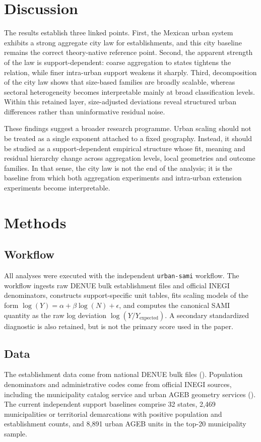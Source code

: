\documentclass[11pt]{article}
\begin{document}
\section*{Discussion}
The results establish three linked points. First, the Mexican urban system exhibits a strong aggregate city law for establishments, and this city baseline remains the correct theory-native reference point. Second, the apparent strength of the law is support-dependent: coarse aggregation to states tightens the relation, while finer intra-urban support weakens it sharply. Third, decomposition of the city law shows that size-based families are broadly scalable, whereas sectoral heterogeneity becomes interpretable mainly at broad classification levels. Within this retained layer, size-adjusted deviations reveal structured urban differences rather than uninformative residual noise.

These findings suggest a broader research programme. Urban scaling should not be treated as a single exponent attached to a fixed geography. Instead, it should be studied as a support-dependent empirical structure whose fit, meaning and residual hierarchy change across aggregation levels, local geometries and outcome families. In that sense, the city law is not the end of the analysis; it is the baseline from which both aggregation experiments and intra-urban extension experiments become interpretable.

\section*{Methods}
\subsection*{Workflow}
All analyses were executed with the independent \texttt{urban-sami} workflow. The workflow ingests raw DENUE bulk establishment files and official INEGI denominators, constructs support-specific unit tables, fits scaling models of the form $\log(Y) = \alpha + \beta \log(N) + \epsilon$, and computes the canonical SAMI quantity as the raw log deviation $\log(Y/Y_{\mathrm{expected}})$. A secondary standardized diagnostic is also retained, but is not the primary score used in the paper.

\subsection*{Data}
The establishment data come from national DENUE bulk files (\citealp{denue}). Population denominators and administrative codes come from official INEGI sources, including the municipality catalog service and urban AGEB geometry services (\citealp{inegi_catalogo}). The current independent support baselines comprise 32 states, 2,469 municipalities or territorial demarcations with positive population and establishment counts, and 8,891 urban AGEB units in the top-20 municipality sample.
\end{document}
